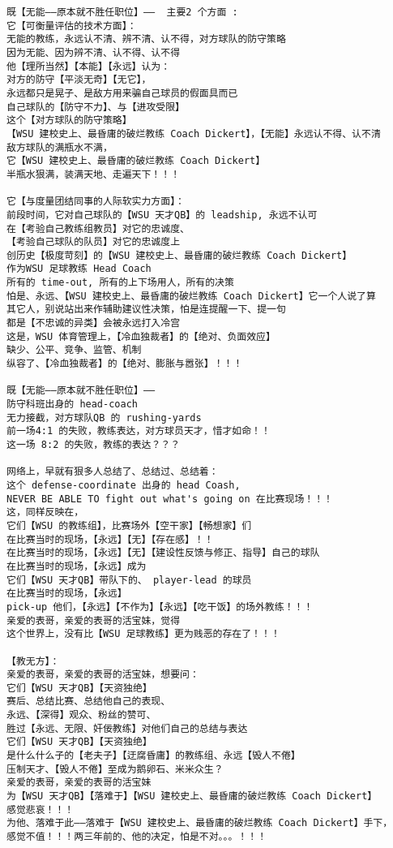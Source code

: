 \documentclass[9pt, b5paper]{article}
\begin{document}
\begin{verbatim}
既【无能——原本就不胜任职位】——  主要2 个方面 :
它【可衡量评估的技术方面】：
无能的教练，永远认不清、辨不清、认不得，对方球队的防守策略
因为无能、因为辨不清、认不得、认不得
他【理所当然】【本能】【永远】认为：
对方的防守【平淡无奇】【无它】，
永远都只是晃子、是敌方用来骗自己球员的假面具而已
自己球队的【防守不力】、与【进攻受限】
这个【对方球队的防守策略】
【WSU 建校史上、最昏庸的破烂教练 Coach Dickert】，【无能】永远认不得、认不清
敌方球队的满瓶水不满，
它【WSU 建校史上、最昏庸的破烂教练 Coach Dickert】
半瓶水狠满，装满天地、走遍天下！！！

它【与度量团结同事的人际软实力方面】：
前段时间，它对自己球队的【WSU 天才QB】的 leadship, 永远不认可
在【考验自己教练组教员】对它的忠诚度、
【考验自己球队的队员】对它的忠诚度上
创历史【极度苛刻】的【WSU 建校史上、最昏庸的破烂教练 Coach Dickert】
作为WSU 足球教练 Head Coach
所有的 time-out, 所有的上下场用人，所有的决策
怕是、永远、【WSU 建校史上、最昏庸的破烂教练 Coach Dickert】它一个人说了算
其它人，别说站出来作辅助建议性决策，怕是连提醒一下、提一句
都是【不忠诚的异类】会被永远打入冷宫
这是，WSU 体育管理上，【冷血独裁者】的【绝对、负面效应】
缺少、公平、竞争、监管、机制
纵容了、【冷血独裁者】的【绝对、膨胀与嚣张】！！！

既【无能——原本就不胜任职位】——
防守科班出身的 head-coach
无力接截，对方球队QB 的 rushing-yards
前一场4:1 的失败，教练表达，对方球员天才，惜才如命！！
这一场 8:2 的失败，教练的表达？？？

网络上，早就有狠多人总结了、总结过、总结着：
这个 defense-coordinate 出身的 head Coash,
NEVER BE ABLE TO fight out what's going on 在比赛现场！！！
这，同样反映在，
它们【WSU 的教练组】，比赛场外【空干家】【畅想家】们
在比赛当时的现场，【永远】【无】【存在感】！！
在比赛当时的现场，【永远】【无】【建设性反馈与修正、指导】自己的球队
在比赛当时的现场，【永远】成为
它们【WSU 天才QB】带队下的、 player-lead 的球员
在比赛当时的现场，【永远】
pick-up 他们，【永远】【不作为】【永远】【吃干饭】的场外教练！！！
亲爱的表哥，亲爱的表哥的活宝妹，觉得
这个世界上，没有比【WSU 足球教练】更为贱恶的存在了！！！

【教无方】：
亲爱的表哥，亲爱的表哥的活宝妹，想要问：
它们【WSU 天才QB】【天资独绝】
赛后、总结比赛、总结他自己的表现、
永远、【深得】观众、粉丝的赞可、
胜过【永远、无限、奸佞教练】对他们自己的总结与表达
它们【WSU 天才QB】【天资独绝】
是什么什么子的【老夫子】【迂腐昏庸】的教练组、永远【毁人不倦】
压制天才、【毁人不倦】至成为鹅卵石、米米众生？
亲爱的表哥，亲爱的表哥的活宝妹
为【WSU 天才QB】【落难于】【WSU 建校史上、最昏庸的破烂教练 Coach Dickert】
感觉悲哀！！！
为他、落难于此——落难于【WSU 建校史上、最昏庸的破烂教练 Coach Dickert】手下，
感觉不值！！！两三年前的、他的决定，怕是不对。。。！！！


\end{verbatim}
\end{document}
